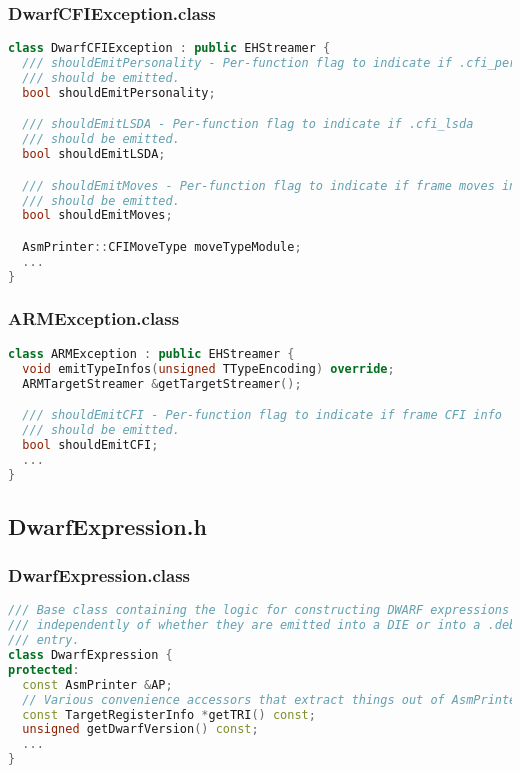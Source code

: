 \documentclass{ctexart}
\begin{document}
\subsubsection{DwarfCFIException.class}
\begin{lstlisting}[language=C++]
class DwarfCFIException : public EHStreamer {
  /// shouldEmitPersonality - Per-function flag to indicate if .cfi_personality
  /// should be emitted.
  bool shouldEmitPersonality;

  /// shouldEmitLSDA - Per-function flag to indicate if .cfi_lsda
  /// should be emitted.
  bool shouldEmitLSDA;

  /// shouldEmitMoves - Per-function flag to indicate if frame moves info
  /// should be emitted.
  bool shouldEmitMoves;

  AsmPrinter::CFIMoveType moveTypeModule;
  ...
}
\end{lstlisting}
  
  
\subsubsection{ARMException.class}
\begin{lstlisting}[language=C++]
 class ARMException : public EHStreamer {
  void emitTypeInfos(unsigned TTypeEncoding) override;
  ARMTargetStreamer &getTargetStreamer();

  /// shouldEmitCFI - Per-function flag to indicate if frame CFI info
  /// should be emitted.
  bool shouldEmitCFI;
  ...
}
\end{lstlisting}


\subsection{DwarfExpression.h}

\subsubsection{DwarfExpression.class}
\begin{lstlisting}[language=C++]
/// Base class containing the logic for constructing DWARF expressions
/// independently of whether they are emitted into a DIE or into a .debug_loc
/// entry.
class DwarfExpression {
protected:
  const AsmPrinter &AP;
  // Various convenience accessors that extract things out of AsmPrinter.
  const TargetRegisterInfo *getTRI() const;
  unsigned getDwarfVersion() const;
  ...
}
\end{lstlisting}
\end{document}
